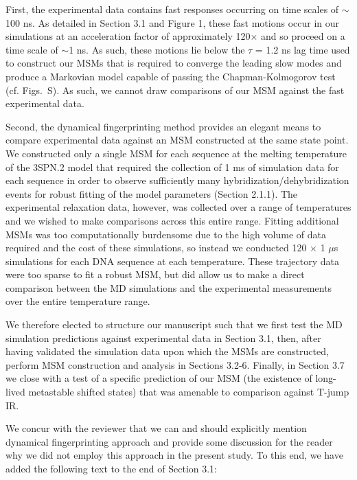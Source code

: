 \documentclass[11pt,a4paper]{letter} %
\newcommand*{\rood}[1]{{\color{red}{#1}}}
\begin{document}
First, the experimental data contains fast responses occurring on time scales of $\sim$100 ns. As detailed in Section 3.1 and Figure 1, these fast motions occur in our simulations at an acceleration factor of approximately 120$\times$ and so proceed on a time scale of $\sim$1 ns. As such, these motions lie below the $\tau$ = 1.2 ns lag time used to construct our MSMs that is required to converge the leading slow modes and produce a Markovian model capable of passing the Chapman-Kolmogorov test (cf. Figs.~S\rood{2-3}). As such, we cannot draw comparisons of our MSM against the fast experimental data. 

Second, the dynamical fingerprinting method provides an elegant means to compare experimental data against an MSM constructed at the same state point. We constructed only a single MSM for each sequence at the melting temperature of the 3SPN.2 model that required the collection of 1 ms of simulation data for each sequence in order to observe sufficiently many hybridization/dehybridization events for robust fitting of the model parameters (Section 2.1.1). The experimental relaxation data, however, was collected over a range of temperatures and we wished to make comparisons across this entire range. Fitting additional MSMs was too computationally burdensome due to the high volume of data required and the cost of these simulations, so instead we conducted 120 $\times$ 1 $\mu$s simulations for each DNA sequence at each temperature. These trajectory data were too sparse to fit a robust MSM, but did allow us to make a direct comparison between the MD simulations and the experimental measurements over the entire temperature range. 

We therefore elected to structure our manuscript such that we first test the MD simulation predictions against experimental data in Section 3.1, then, after having validated the simulation data upon which the MSMs are constructed, perform MSM construction and analysis in Sections 3.2-6. Finally, in Section 3.7 we close with a test of a specific prediction of our MSM (the existence of long-lived metastable shifted states) that was amenable to comparison against T-jump IR.

We concur with the reviewer that we can and should explicitly mention dynamical fingerprinting approach and provide some discussion for the reader why we did not employ this approach in the present study. To this end, we have added the following text to the end of Section 3.1:
\end{document}
